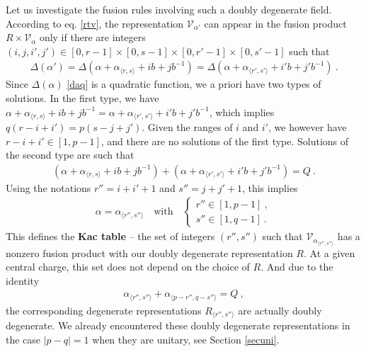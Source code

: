 \documentclass[12pt, a4paper, notitlepage, twoside]{report}
\numberwithin{equation}{section}
\theoremstyle{break}
\begin{document}
Let us investigate the fusion rules involving such a doubly degenerate field.
According to eq. \eqref{rtv}, the representation $\mathcal{V}_{\alpha'} $ can appear in the fusion product $R\times \mathcal{V}_\alpha$ only if there are integers $(i,j,i',j')\in [0,r-1]\times [0,s-1]\times [0,r'-1]\times [0,s'-1]$ such that 
\begin{align}
 \Delta(\alpha') = \Delta\left(\alpha+\alpha_{\langle r,s \rangle} + ib+jb^{-1}\right) = \Delta\left(\alpha+\alpha_{\langle r',s' \rangle} +i'b+j'b^{-1}\right) \ .
\end{align}
Since $\Delta(\alpha)$ \eqref{daq} is a quadratic function, we a priori have two types of solutions.
In the first type, we have $\alpha+\alpha_{\langle r,s \rangle} + ib+jb^{-1} = \alpha+\alpha_{\langle r',s' \rangle} +i'b+j'b^{-1}$, which implies $q(r-i+i')=p(s-j+j')$.
Given the ranges of $i$ and $i'$, we however have $r-i+i'\in [1,p-1]$, and there are no solutions of the first type.
Solutions of the second type are such that 
\begin{align}
 \left(\alpha+\alpha_{\langle r,s \rangle} + ib+jb^{-1}\right) + \left(\alpha+\alpha_{\langle r',s' \rangle} +i'b+j'b^{-1}\right) = Q\ .
\end{align}
Using the notations $r'' = i+i'+1$ and $s''=j+j'+1$, this implies
\begin{align}
 \alpha=\alpha_{\langle r'',s'' \rangle}\quad \text{with}\quad  \left\{\begin{array}{l}  r'' \in [1,p-1]\ , \\ s'' \in [1,q-1]\ . \end{array}\right. 
\label{rpsq}
\end{align}
This defines the \textbf{\boldmath Kac table} -- the set of integers $(r'',s'')$ such that $\mathcal{V}_{\alpha_{\langle r'',s''\rangle}}$ has a nonzero fusion product with our doubly degenerate representation $R$.
At a given central charge, this set does not depend on the choice of $R$. 
And due to the identity 
\begin{align}
 \alpha_{\langle r'',s'' \rangle}+\alpha_{\langle p-r'',q-s'' \rangle}=Q\ ,
\end{align}
the corresponding degenerate representations $R_{\langle r'', s'' \rangle}$ are actually doubly degenerate. 
We already encountered these doubly degenerate representations in the case $|p-q|=1$ when they are unitary, see Section \ref{secuni}. 
\end{document}
